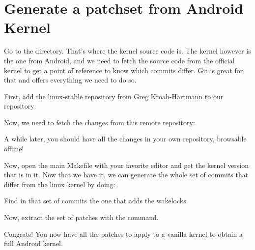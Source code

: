 \section{Generate a patchset from Android Kernel}

Go to the  directory. That's where the kernel source code is. The
kernel however is the one from Android, and we need to fetch the source code
from the official kernel to get a point of reference to know which commits
differ. Git is great for that and offers everything we need to do so.

First, add the linux-stable repository from Greg Kroah-Hartmann to our
repository:


Now, we need to fetch the changes from this remote repository:


A while later, you should have all the changes in your own repository, browsable
offline!

Now, open the main Makefile with your favorite editor and get the kernel version
that is in it. Now that we have it, we can generate the whole set of commits that
differ from the linux kernel by doing:


Find in that set of commits the one that adds the wakelocks.

Now, extract the set of patches with the  command.

Congrats! You now have all the patches to apply to a vanilla kernel to obtain a
full Android kernel.
